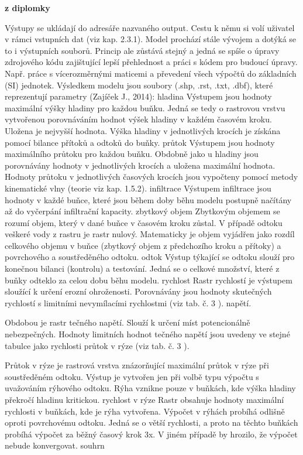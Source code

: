 \textbf{ z diplomky}

Výstupy se ukládají do adresáře nazvaného output. Cestu k němu si volí uživatel v rámci vstupních dat (viz kap. 2.3.1). Model prochází stále vývojem a dotýká se to i výstupních souborů. Princip ale zůstává stejný a jedná se spíše o úpravy zdrojového kódu zajištující lepší přehlednost a práci s kódem pro budoucí úpravy. Např. práce s vícerozměrnými maticemi a převedení všech výpočtů do základních (SI) jednotek. 
Výsledkem modelu jsou soubory (.shp, .rst, .txt, .dbf), které reprezentují parametry (Zajíček J., 2014):
hladina
Výstupem jsou hodnoty maximální výšky hladiny pro každou buňku. Jedná se tedy o rastrovou vrstvu vytvořenou porovnáváním hodnot výšek hladiny v každém časovém kroku. Uložena je nejvyšší hodnota. Výška hladiny v jednotlivých krocích je získána pomocí bilance přítoků a odtoků do buňky.  
průtok
Výstupem jsou hodnoty maximálního průtoku pro každou buňku. Obdobně jako u hladiny jsou porovnávány hodnoty v jednotlivých krocích a uložena maximální hodnota. Hodnoty průtoku v jednotlivých časových krocích jsou vypočteny pomocí metody kinematické vlny (teorie viz kap. 1.5.2).
infiltrace
Výstupem infiltrace jsou hodnoty v každé buňce, které jsou během doby běhu modelu postupně načítány až do vyčerpání infiltrační kapacity.
zbytkový objem
Zbytkovým objemem se rozumí objem, který v dané buňce v časovém kroku zůstal. V případě odtoku veškeré vody z rastru je rastr nulový. Matematicky je objem vyjádřen jako rozdíl celkového objemu v buňce (zbytkový objem z předchozího kroku a přítoky) a povrchového a soustředěného odtoku.
odtok
Výstup týkající se odtoku slouží pro konečnou bilanci (kontrolu) a testování. Jedná se o celkové množství, které z buňky odteklo za celou dobu běhu modelu. 
rychlost
Rastr rychlostí je výstupem sloužící k určení erozní ohroženosti. Porovnávány jsou hodnoty skutečných rychlostí s limitními nevymílacími rychlostmi (viz tab. č. 3 ).
napětí. 

Obdobou je rastr tečného napětí. Slouží k určení míst potencionálně nebezpečných. Hodnoty limitních hodnot tečného napětí jsou uvedeny ve stejné tabulce jako rychlosti průtok v rýze (viz tab. č. 3 ).

Průtok v rýze je rastrová vrstva znázorňující maximální průtok v rýze při soustředěném odtoku. Výstup je vytvořen jen při volbě typu výpočtu s uvažováním rýhového odtoku. Rýha vznikne pouze v buňkách, kde výška hladiny překročí hladinu kritickou. 
rychlost v rýze
Rastr obsahuje hodnoty maximální rychlosti v buňkách, kde je rýha vytvořena. Výpočet v rýhách probíhá odlišně oproti povrchovému odtoku. Jedná se o větší rychlosti, a proto na těchto buňkách probíhá výpočet za běžný časový krok 3x. V jiném případě by hrozilo, že výpočet nebude konvergovat.
souhrn


